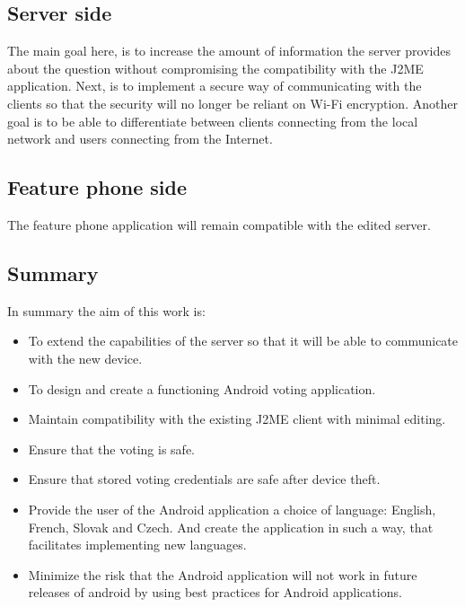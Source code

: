 \documentclass[11pt,twoside,a4paper]{book}
\begin{document}
\subsection{Server side}
The main goal here, is to increase the amount of information the server provides about the question without compromising the compatibility with the J2ME application. Next, is to implement a secure way of communicating with the clients so that the security will no longer be reliant on Wi-Fi encryption. Another goal is to be able to differentiate between clients connecting from the local network and users connecting from the Internet.




\subsection{Feature phone side}
The feature phone application will remain compatible with the edited server. \\

\subsection{Summary}
In summary the aim of this work is:

\begin{itemize}
\item To extend the capabilities of the server so that it will be able to communicate with the new device.
\item To design and create a functioning Android voting application.
\item Maintain compatibility with the existing J2ME client with minimal editing.
\item Ensure that the voting is safe.
\item Ensure that stored voting credentials are safe after device theft.
\item Provide the user of the Android application a choice of language: English, French, Slovak and Czech. And create the application in such a way, that facilitates implementing new languages.
\item Minimize the risk that the Android application will not work in future releases of android by using best practices for Android applications.
\end{itemize}
\end{document}

